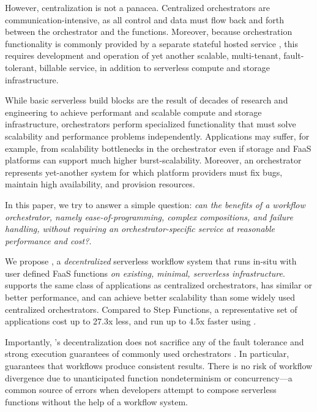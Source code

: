 However, centralization is not a panacea. Centralized orchestrators are
communication-intensive, as all control and data must flow back and forth
between the orchestrator and the functions. Moreover, because orchestration
functionality is commonly provided by a separate stateful hosted service
\cite{aws-step-functions, google-cloud-composer, google-workflows}, this
requires development and operation of yet another scalable, multi-tenant,
fault-tolerant, billable service, in addition to serverless compute and storage
infrastructure.


While basic serverless build blocks are the result of decades of research and
engineering to achieve performant and scalable compute and storage
infrastructure, orchestrators perform specialized functionality that must solve
scalability and performance problems independently. Applications may suffer, for
example, from scalability bottlenecks in the orchestrator even if storage and
FaaS platforms can support much higher burst-scalability. Moreover, an
orchestrator represents yet-another system for which platform providers must fix
bugs, maintain high availability, and provision resources.

In this paper, we try to answer a simple question: \textit{can the benefits of a
workflow  orchestrator, namely ease-of-programming, complex compositions, and
failure handling, without requiring an orchestrator-specific service at
reasonable performance and cost?}.

We propose \name{}, a \textit{decentralized} serverless workflow system that
runs in-situ with user defined FaaS functions \textit{on existing, minimal,
serverless infrastructure}. \name{} supports the same class of applications as
centralized orchestrators, has similar or better performance, and can achieve
better scalability than some widely used centralized orchestrators. Compared to
Step Functions, a representative set of applications cost up to 27.3x less, and
run up to 4.5x faster using \name{}.

Importantly, \name{}'s decentralization does not sacrifice any of the   fault
tolerance and strong execution guarantees of  commonly used orchestrators
\cite{aws-step-functions, durable-functions, google-cloud-composer,
google-workflows}.  In particular, \name{} guarantees that workflows produce
consistent results. There is no risk of workflow divergence due to
unanticipated function nondeterminism or concurrency---a common source of
errors when developers attempt to compose serverless functions without the
help of a workflow system.

